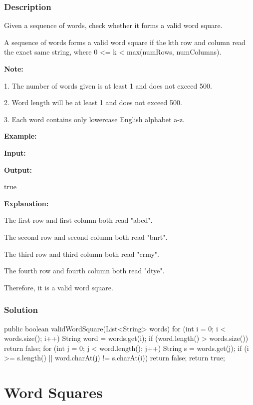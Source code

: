 \subsubsection{Description}
Given a sequence of words, check whether it forms a valid word square.

A sequence of words forms a valid word square if the kth row and column read the exact same string, where 0 <= k < max(numRows, numColumns).

\textbf{Note:}

1. The number of words given is at least 1 and does not exceed 500.

2. Word length will be at least 1 and does not exceed 500.

3. Each word contains only lowercase English alphabet a-z.

\textbf{Example:}

\textbf{Input:}

\begin{Code}
\end{Code}

\textbf{Output:}

true

\textbf{Explanation:}

The first row and first column both read "abcd".

The second row and second column both read "bnrt".

The third row and third column both read "crmy".

The fourth row and fourth column both read "dtye".

Therefore, it is a valid word square.

\subsubsection{Solution}
\begin{Code}
public boolean validWordSquare(List<String> words) {
    for (int i = 0; i < words.size(); i++) {
        String word = words.get(i);
        if (word.length() > words.size()) {
            return false;
        }
        for (int j = 0; j < word.length(); j++) {
            String s = words.get(j);
            if (i >= s.length() || word.charAt(j) != s.charAt(i)) {
                return false;
            }
        }
    }
    return true;
}
\end{Code}

\newpage

\section{Word Squares} %
